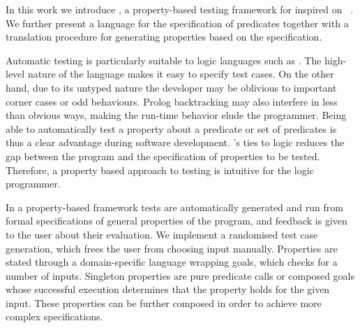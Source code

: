 In this work we introduce \plqc{}, a
property-based testing framework for \Prolog{} inspired on
 \QuickCheck~\cite{quickcheck}.
%
We further present a language for the specification of \Prolog{} predicates
together with a translation procedure for generating \plqc{} properties
based on the specification.


Automatic testing is particularly suitable to logic languages such as
\Prolog{}. The high-level nature of the language makes it easy to
specify test cases.
%
On the other hand, due to its untyped nature the developer may be
oblivious to important corner cases or odd behaviours.
%
Prolog backtracking may also interfere in less than obvious
ways, making the run-time behavior elude the programmer.
%
Being able to automatically test a property about a predicate or set of
predicates is thus a clear advantage during software development.
%
\Prolog{}'s ties to logic reduces the gap between the program and the
specification of properties to be tested.
%
Therefore, a property based approach to testing is intuitive for the
logic programmer.  


In a property-based framework tests are automatically generated and run from formal specifications of general
properties of the program, and feedback is given to the user about their
evaluation.
%
We implement a randomised test case generation, which frees the user
from choosing input manually.
%
Properties are stated through a domain-specific language wrapping
\Prolog{} goals, which \plqc{} checks for a number of inputs.
%
Singleton properties are pure predicate calls
or composed goals whose successful execution determines that the
property holds for the given input.
%
These properties can be further composed in order to achieve more complex
specifications.




